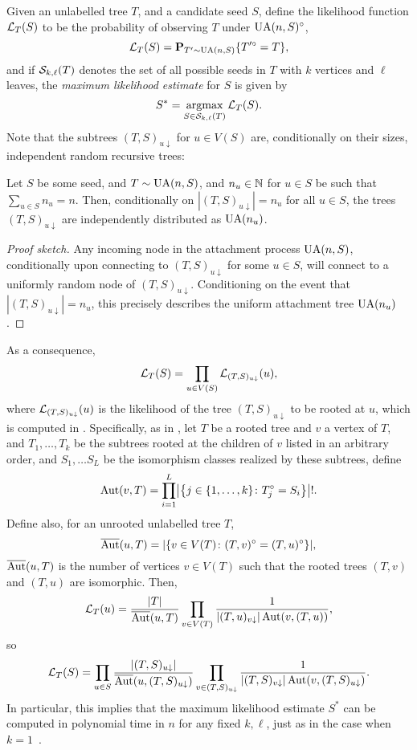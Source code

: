 Given an unlabelled tree $T$, and a candidate seed $S$, define the
likelihood function $\mathcal{L}_{T}(S)$ to be the probability of observing
$T$ under $\operatorname{UA}(n, S)^\circ$, \ie
\[
  \mathcal{L}_{T}(S) = \operatorname{\mathbf{P}}_{T' \sim \operatorname{UA}(n, S)}\{T'^\circ = T\} ,
\]
and if $\mathcal{S}_{k, \ell}(T)$ denotes the set of all possible seeds in $T$
with $k$ vertices and $\ell$ leaves, the \emph{maximum likelihood
  estimate} for $S$ is given by
\[
  S^* = \operatorname*{argmax}_{S \in \mathcal{S}_{k, \ell}(T)} \mathcal{L}_{T}(S) .
\]
Note that the subtrees $(T, S)_{u \downarrow}$ for $u \in V(S)$ are,
conditionally on their sizes, independent random recursive trees:
\begin{lem}
  Let $S$ be some seed, and $T \sim \operatorname{UA}(n, S)$, and $n_u \in \mathbb{N}$ for
  $u \in S$ be such that $\sum_{u \in S} n_u = n$. Then, conditionally
  on $|(T, S)_{u \downarrow}| = n_u$ for all $u \in S$, the trees
  $(T, S)_{u \downarrow}$ are independently distributed as $\operatorname{UA}(n_u)$.
\end{lem}
\begin{proof}[Proof sketch]
  Any incoming node in the attachment process $\operatorname{UA}(n, S)$,
  conditionally upon connecting to $(T, S)_{u \downarrow}$ for some
  $u \in S$, will connect to a uniformly random node of
  $(T, S)_{u \downarrow}$. Conditioning on the event that
  $|(T, S)_{u \downarrow}| = n_u$, this precisely describes the
  uniform attachment tree $\operatorname{UA}(n_u)$.
\end{proof}

As a consequence,
\begin{equation}
  \sL_T(S) = \prod_{u \in V(S)} \sL_{(T, S)_{u \downarrow}}(u) , \eqlabel{mle}
\end{equation}
where $\mathcal{L}_{(T, S)_{u \downarrow}}(u)$ is the likelihood of the tree
$(T, S)_{u \downarrow}$ to be rooted at $u$, which is computed in
\cite[Section 3]{finding-adam}. Specifically, as in
\cite{finding-adam}, let $T$ be a rooted tree and $v$ a vertex of $T$,
and $T_1, \dots, T_k$ be the subtrees rooted at the children of $v$
listed in an arbitrary order, and $S_1, \dots S_L$ be the isomorphism
classes realized by these subtrees, define
\[
  \operatorname{Aut}(v, T) = \prod_{i = 1}^L \bigl|\bigl\{j \in \{1, \dots, k\} \colon T_j^\circ = S_i\bigr\}\bigr| ! .
\]
Define also, for an unrooted unlabelled tree $T$,
\[
  \overline{\operatorname{Aut}}(u, T) = |\{v \in V(T) \colon (T, v)^\circ = (T, u)^\circ\} | ,
\]
\ie $\overline{\operatorname{Aut}}(u, T)$ is the number of vertices $v \in V(T)$
such that the rooted trees $(T, v)$ and $(T, u)$ are isomorphic. Then,
\[
  \mathcal{L}_T(u) = \frac{|T|}{\overline{\operatorname{Aut}}(u, T)} \prod_{v \in V(T)} \frac{1}{|(T, u)_{v \downarrow}| \operatorname{Aut}(v, (T, u))} ,
\]
so
\begin{equation}
  \sL_T(S) = \prod_{u \in S} \frac{|(T, S)_{u \downarrow}|}{\overline{\Aut}(u, (T, S)_{u \downarrow})} \prod_{v \in (T, S)_{u \downarrow}} \frac{1}{|(T, S)_{v \downarrow}| \Aut(v, (T, S)_{u \downarrow})} . \eqlabel{likelihood}
\end{equation}
In particular, this implies that the maximum likelihood estimate $S^*$
can be computed in polynomial time in $n$ for any fixed $k, \ell$,
just as in the case when $k = 1$~\cite{finding-adam}.

